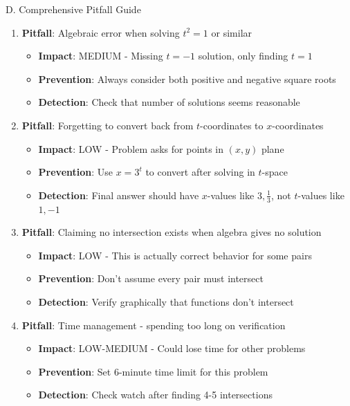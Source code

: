 \documentclass[12pt]{article}
\begin{document}
\begin{roadmapbox}{D. Comprehensive Pitfall Guide}
\begin{enumerate}[leftmargin=*]
    \item \textbf{Pitfall}: Algebraic error when solving $t^2 = 1$ or similar
    \begin{itemize}
        \item \textbf{Impact}: MEDIUM - Missing $t = -1$ solution, only finding $t = 1$
        \item \textbf{Prevention}: Always consider both positive and negative square roots
        \item \textbf{Detection}: Check that number of solutions seems reasonable
    \end{itemize}
    
    \item \textbf{Pitfall}: Forgetting to convert back from $t$-coordinates to $x$-coordinates
    \begin{itemize}
        \item \textbf{Impact}: LOW - Problem asks for points in $(x, y)$ plane
        \item \textbf{Prevention}: Use $x = 3^t$ to convert after solving in $t$-space
        \item \textbf{Detection}: Final answer should have $x$-values like $3, \frac{1}{3}$, not $t$-values like $1, -1$
    \end{itemize}
    
    \item \textbf{Pitfall}: Claiming no intersection exists when algebra gives no solution
    \begin{itemize}
        \item \textbf{Impact}: LOW - This is actually correct behavior for some pairs
        \item \textbf{Prevention}: Don't assume every pair must intersect
        \item \textbf{Detection}: Verify graphically that functions don't intersect
    \end{itemize}
    
    \item \textbf{Pitfall}: Time management - spending too long on verification
    \begin{itemize}
        \item \textbf{Impact}: LOW-MEDIUM - Could lose time for other problems
        \item \textbf{Prevention}: Set 6-minute time limit for this problem
        \item \textbf{Detection}: Check watch after finding 4-5 intersections
    \end{itemize}
\end{enumerate}
\end{roadmapbox}
\end{document}
